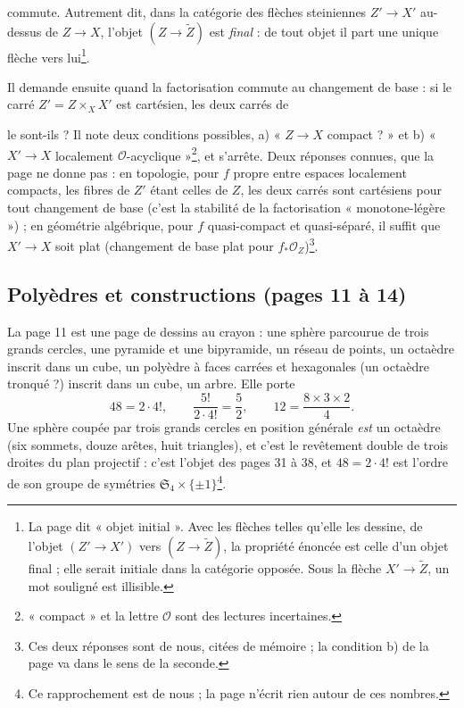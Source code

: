 \documentclass[11pt,a4paper]{article}
\begin{document}

commute. Autrement dit, dans la catégorie des flèches steiniennes $Z' \to X'$
au-dessus de $Z \to X$, l'objet $(Z \to \widetilde{Z})$ est \emph{final} :
de tout objet il part une unique flèche vers lui\footnote{La page dit « objet
initial ». Avec les flèches telles qu'elle les dessine, de l'objet
$(Z' \to X')$ vers $(Z \to \widetilde{Z})$, la propriété énoncée est
celle d'un objet final ; elle serait initiale dans la catégorie opposée.
Sous la flèche $X' \to \widetilde{Z}$, un mot souligné est illisible.}.

Il demande ensuite quand la factorisation commute au changement de base :
si le carré $Z' = Z \times_X X'$ est cartésien, les deux carrés de


le sont-ils ? Il note deux conditions possibles, a) « $Z \to X$ compact ? »
et b) « $X' \to X$ localement $\mathcal{O}$-acyclique »\footnote{« compact »
et la lettre $\mathcal{O}$ sont des lectures incertaines.}, et s'arrête. Deux
réponses connues, que la page ne donne pas : en topologie, pour $f$ propre
entre espaces localement compacts, les fibres de $Z'$ étant celles de $Z$,
les deux carrés sont cartésiens pour tout changement de base (c'est la
stabilité de la factorisation « monotone-légère ») ; en géométrie algébrique,
pour $f$ quasi-compact et quasi-séparé, il suffit que $X' \to X$ soit plat
(changement de base plat pour $f_*\mathcal{O}_Z$)\footnote{Ces deux réponses
sont de nous, citées de mémoire ; la condition b) de la page va dans le
sens de la seconde.}.

\subsection*{Polyèdres et constructions (pages 11 à 14)}

La page 11 est une page de dessins au crayon : une sphère parcourue de trois
grands cercles, une pyramide et une bipyramide, un réseau de points, un
octaèdre inscrit dans un cube, un polyèdre à faces carrées et hexagonales
(un octaèdre tronqué ?) inscrit dans un cube, un arbre. Elle porte
\[
48 = 2 \cdot 4!, \qquad \frac{5!}{2 \cdot 4!} = \frac{5}{2}, \qquad
12 = \frac{8 \times 3 \times 2}{4}.
\]
Une sphère coupée par trois grands cercles en position générale \emph{est}
un octaèdre (six sommets, douze arêtes, huit triangles), et c'est le
revêtement double de trois droites du plan projectif : c'est l'objet des
pages 31 à 38, et $48 = 2 \cdot 4!$ est l'ordre de son groupe de symétries
$\mathfrak{S}_4 \times \{\pm 1\}$\footnote{Ce rapprochement est de nous ; la
page n'écrit rien autour de ces nombres.}.
\end{document}
